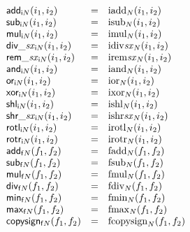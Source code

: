 $$
\begin{array}[t]{@{}lcl@{}l@{}}
{\mathsf{add}}{{}_{{\mathsf{i}}{N}}(i_1, i_2)} & = & {{\mathrm{iadd}}}_{N}(i_1, i_2) \\
{\mathsf{sub}}{{}_{{\mathsf{i}}{N}}(i_1, i_2)} & = & {{\mathrm{isub}}}_{N}(i_1, i_2) \\
{\mathsf{mul}}{{}_{{\mathsf{i}}{N}}(i_1, i_2)} & = & {{\mathrm{imul}}}_{N}(i_1, i_2) \\
{{\mathsf{div}}{\mathsf{\_}}{{\mathit{sx}}}}{{}_{{\mathsf{i}}{N}}(i_1, i_2)} & = & {{\mathrm{idiv}}}{{\mathit{sx}}}{{}_{N}(i_1, i_2)} \\
{{\mathsf{rem}}{\mathsf{\_}}{{\mathit{sx}}}}{{}_{{\mathsf{i}}{N}}(i_1, i_2)} & = & {{\mathrm{irem}}}{{\mathit{sx}}}{{}_{N}(i_1, i_2)} \\
{\mathsf{and}}{{}_{{\mathsf{i}}{N}}(i_1, i_2)} & = & {{\mathrm{iand}}}_{N}(i_1, i_2) \\
{\mathsf{or}}{{}_{{\mathsf{i}}{N}}(i_1, i_2)} & = & {{\mathrm{ior}}}_{N}(i_1, i_2) \\
{\mathsf{xor}}{{}_{{\mathsf{i}}{N}}(i_1, i_2)} & = & {{\mathrm{ixor}}}_{N}(i_1, i_2) \\
{\mathsf{shl}}{{}_{{\mathsf{i}}{N}}(i_1, i_2)} & = & {{\mathrm{ishl}}}_{N}(i_1, i_2) \\
{{\mathsf{shr}}{\mathsf{\_}}{{\mathit{sx}}}}{{}_{{\mathsf{i}}{N}}(i_1, i_2)} & = & {{\mathrm{ishr}}}{{\mathit{sx}}}{{}_{N}(i_1, i_2)} \\
{\mathsf{rotl}}{{}_{{\mathsf{i}}{N}}(i_1, i_2)} & = & {{\mathrm{irotl}}}_{N}(i_1, i_2) \\
{\mathsf{rotr}}{{}_{{\mathsf{i}}{N}}(i_1, i_2)} & = & {{\mathrm{irotr}}}_{N}(i_1, i_2) \\
{\mathsf{add}}{{}_{{\mathsf{f}}{N}}(f_1, f_2)} & = & {{\mathrm{fadd}}}_{N}(f_1, f_2) \\
{\mathsf{sub}}{{}_{{\mathsf{f}}{N}}(f_1, f_2)} & = & {{\mathrm{fsub}}}_{N}(f_1, f_2) \\
{\mathsf{mul}}{{}_{{\mathsf{f}}{N}}(f_1, f_2)} & = & {{\mathrm{fmul}}}_{N}(f_1, f_2) \\
{\mathsf{div}}{{}_{{\mathsf{f}}{N}}(f_1, f_2)} & = & {{\mathrm{fdiv}}}_{N}(f_1, f_2) \\
{\mathsf{min}}{{}_{{\mathsf{f}}{N}}(f_1, f_2)} & = & {{\mathrm{fmin}}}_{N}(f_1, f_2) \\
{\mathsf{max}}{{}_{{\mathsf{f}}{N}}(f_1, f_2)} & = & {{\mathrm{fmax}}}_{N}(f_1, f_2) \\
{\mathsf{copysign}}{{}_{{\mathsf{f}}{N}}(f_1, f_2)} & = & {{\mathrm{fcopysign}}}_{N}(f_1, f_2) \\
\end{array}
$$

